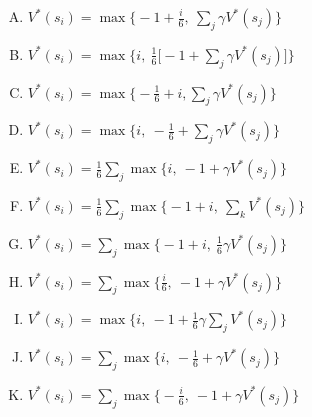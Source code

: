 \documentclass[11pt, answers]{exam}
\begin{document}
\begin{questions}
\begin{parts}
\begin{enumerate}[A.]
	\item $V^*(s_i) = \max \Big\{ -1+\displaystyle\frac{i}{6},\ \sum_j \gamma V^*(s_j) \Big\}$
	\item $V^*(s_i) = \max \Big\{ i,\ \displaystyle\frac{1}{6}\big[-1+\sum_j \gamma V^*(s_j) \big] \Big\}$
	\item $V^*(s_i) = \max \Big\{ -\displaystyle\frac{1}{6}+i, \sum_j \gamma V^*(s_j) \Big\}$
	\item $V^*(s_i) = \max \Big\{ i,\ -\displaystyle\frac{1}{6} + \sum_j \gamma V^*(s_j) \Big\}$
	\item $V^*(s_i) = \displaystyle\frac{1}{6}  \sum_j \max \big\{ i,\ -1+\gamma V^*(s_j) \big\}$
	\item $V^*(s_i) = \displaystyle\frac{1}{6}  \sum_j \max \big\{-1+ i,\ \sum_k V^*(s_j) \big\}$
	\item $V^*(s_i) = \displaystyle\sum_j \max \Big\{-1+ i,\ \displaystyle\frac{1}{6} \gamma V^*(s_j) \Big\}$
	\item $V^*(s_i) = \displaystyle\sum_j \max \Big\{\displaystyle\frac{i}{6},\ -1+\gamma V^*(s_j) \Big\}$
	\item $V^*(s_i) = \max \Big\{i,\ -1+\displaystyle\frac{1}{6}\gamma \sum_j V^*(s_j) \Big\}$
	\item $V^*(s_i) = \displaystyle\sum_j \max \Big\{i,\ -\displaystyle\frac{1}{6}+\gamma V^*(s_j) \Big\}$
	\item $V^*(s_i) = \displaystyle\sum_j \max \Big\{-\displaystyle\frac{i}{6},\ -1+\gamma V^*(s_j) \Big\}$
\end{enumerate}

\end{parts}
\end{questions}
\end{document}
